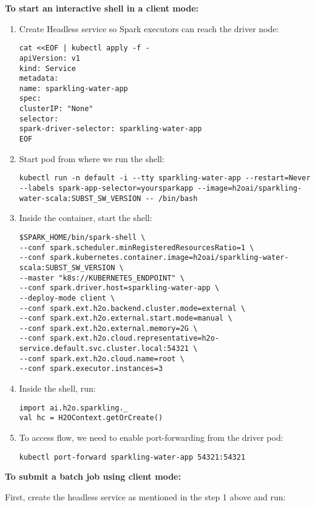 \textbf{To start an interactive shell in a client mode:}

\begin{enumerate}
    \item Create Headless service so Spark executors can reach the driver node:
    \begin{lstlisting}[style=Bash]
cat <<EOF | kubectl apply -f -
apiVersion: v1
kind: Service
metadata:
name: sparkling-water-app
spec:
clusterIP: "None"
selector:
spark-driver-selector: sparkling-water-app
EOF
    \end{lstlisting}
    \item Start pod from where we run the shell:
    \begin{lstlisting}[style=Bash]
kubectl run -n default -i --tty sparkling-water-app --restart=Never --labels spark-app-selector=yoursparkapp --image=h2oai/sparkling-water-scala:SUBST_SW_VERSION -- /bin/bash
    \end{lstlisting}
    \item Inside the container, start the shell:
    \begin{lstlisting}[style=Bash]
$SPARK_HOME/bin/spark-shell \
--conf spark.scheduler.minRegisteredResourcesRatio=1 \
--conf spark.kubernetes.container.image=h2oai/sparkling-water-scala:SUBST_SW_VERSION \
--master "k8s://KUBERNETES_ENDPOINT" \
--conf spark.driver.host=sparkling-water-app \
--deploy-mode client \
--conf spark.ext.h2o.backend.cluster.mode=external \
--conf spark.ext.h2o.external.start.mode=manual \
--conf spark.ext.h2o.external.memory=2G \
--conf spark.ext.h2o.cloud.representative=h2o-service.default.svc.cluster.local:54321 \
--conf spark.ext.h2o.cloud.name=root \
--conf spark.executor.instances=3
    \end{lstlisting}
    \item Inside the shell, run:
    \begin{lstlisting}[style=Scala]
import ai.h2o.sparkling._
val hc = H2OContext.getOrCreate()
    \end{lstlisting}
    \item To access flow, we need to enable port-forwarding from the driver pod:
    \begin{lstlisting}[style=Bash]
kubectl port-forward sparkling-water-app 54321:54321
    \end{lstlisting}
\end{enumerate}

\textbf{To submit a batch job using client mode:}

First, create the headless service as mentioned in the step 1 above and run:

